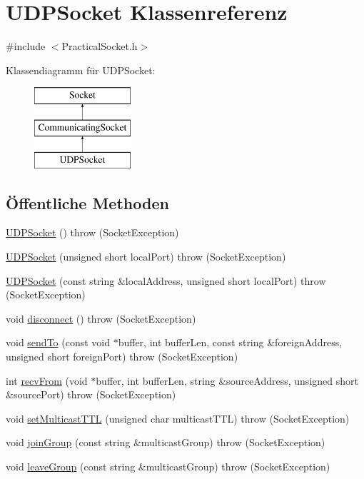 \hypertarget{classUDPSocket}{\section{U\-D\-P\-Socket Klassenreferenz}
\label{classUDPSocket}
}


{\ttfamily \#include $<$Practical\-Socket.\-h$>$}

Klassendiagramm für U\-D\-P\-Socket\-:\begin{figure}[H]
\begin{center}
\leavevmode
\includegraphics[height=3.000000cm]{classUDPSocket}
\end{center}
\end{figure}
\subsection*{Öffentliche Methoden}
\begin{DoxyCompactItemize}
\item 
\hyperlink{classUDPSocket_a4f86f3023f5a08f6355802599a10e100}{U\-D\-P\-Socket} ()  throw (\-Socket\-Exception)
\item 
\hyperlink{classUDPSocket_a14dcb55c4b60b12d4a7fff648cbb825f}{U\-D\-P\-Socket} (unsigned short local\-Port)  throw (\-Socket\-Exception)
\item 
\hyperlink{classUDPSocket_af19281c523f15ed30d7d78f09033713d}{U\-D\-P\-Socket} (const string \&local\-Address, unsigned short local\-Port)  throw (\-Socket\-Exception)
\item 
void \hyperlink{classUDPSocket_a7482e8e61cef160e1a7c0d6ac15c01be}{disconnect} ()  throw (\-Socket\-Exception)
\item 
void \hyperlink{classUDPSocket_a41a3595e226f273953cbd38618af5d5b}{send\-To} (const void $\ast$buffer, int buffer\-Len, const string \&foreign\-Address, unsigned short foreign\-Port)  throw (\-Socket\-Exception)
\item 
int \hyperlink{classUDPSocket_abcd5c064e2496bd8b1888fd4e1b68949}{recv\-From} (void $\ast$buffer, int buffer\-Len, string \&source\-Address, unsigned short \&source\-Port)  throw (\-Socket\-Exception)
\item 
void \hyperlink{classUDPSocket_a4dcfff33b45d1b84b5a602fc6f4a27f8}{set\-Multicast\-T\-T\-L} (unsigned char multicast\-T\-T\-L)  throw (\-Socket\-Exception)
\item 
void \hyperlink{classUDPSocket_a1b20c1e8bd49a9bd9b53dd4f1c8d4c11}{join\-Group} (const string \&multicast\-Group)  throw (\-Socket\-Exception)
\item 
void \hyperlink{classUDPSocket_a78835eaeca8a5ac039b4579c795e3640}{leave\-Group} (const string \&multicast\-Group)  throw (\-Socket\-Exception)
\end{DoxyCompactItemize}
